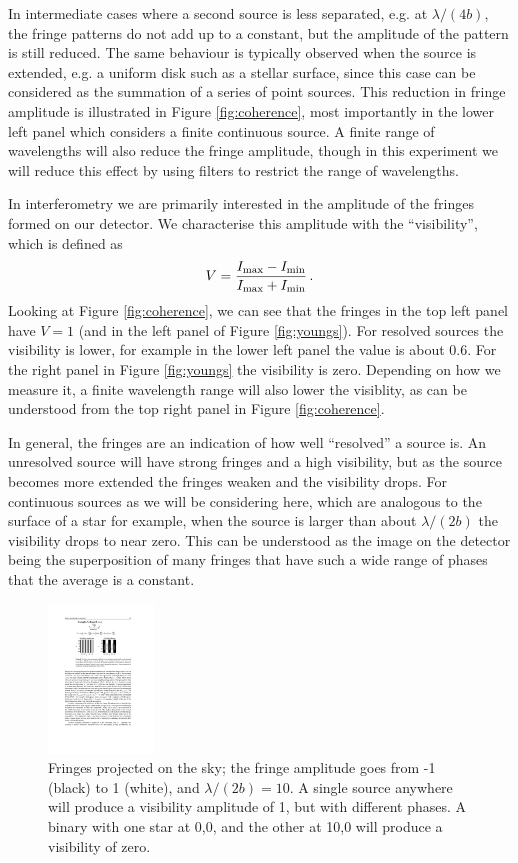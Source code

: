 \documentclass[11pt]{article}
\begin{document}
In intermediate cases where a second source is less separated, e.g. at $\lambda/(4b)$, the fringe patterns do not add up to a constant, but the amplitude of the pattern is still reduced. The same behaviour is typically observed when the source is extended, e.g. a uniform disk such as a stellar surface, since this case can be considered as the summation of a series of point sources. This reduction in fringe amplitude is illustrated in Figure \ref{fig:coherence}, most importantly in the lower left panel which considers a finite continuous source. A finite range of wavelengths will also reduce the fringe amplitude, though in this experiment we will reduce this effect by using filters to restrict the range of wavelengths.

In interferometry we are primarily interested in the amplitude of the fringes formed on our detector. We characterise this amplitude with the ``visibility'', which is defined as
\begin{equation}
    V = \frac{I_{\rm max} - I_{\rm min}}{I_{\rm max} + I_{\rm min}} \, .
\end{equation}
Looking at Figure \ref{fig:coherence}, we can see that the fringes in the top left panel have $V=1$ (and in the left panel of Figure \ref{fig:youngs}). For resolved sources the visibility is lower, for example in the lower left panel the value is about 0.6. For the right panel in Figure \ref{fig:youngs} the visibility is zero. Depending on how we measure it, a finite wavelength range will also lower the visiblity, as can be understood from the top right panel in Figure \ref{fig:coherence}.

\clearpage

In general, the fringes are an indication of how well ``resolved'' a source is. An unresolved source will have strong fringes and a high visibility, but as the source becomes more extended the fringes weaken and the visibility drops. For continuous sources as we will be considering here, which are analogous to the surface of a star for example, when the source is larger than about $\lambda/(2b)$ the visibility drops to near zero. This can be understood as the image on the detector being the superposition of many fringes that have such a wide range of phases that the average is a constant.

\begin{figure}
    \centering
    \includegraphics[width=0.25\textwidth]{sky-fringes.pdf}
    \caption{Fringes projected on the sky; the fringe amplitude goes from -1 (black) to 1 (white), and $\lambda/(2b)=10$. A single source anywhere will produce a visibility amplitude of 1, but with different phases. A binary with one star at 0,0, and the other at 10,0 will produce a visibility of zero.}
    \label{fig:sky-fringes}
\end{figure}
\end{document}
